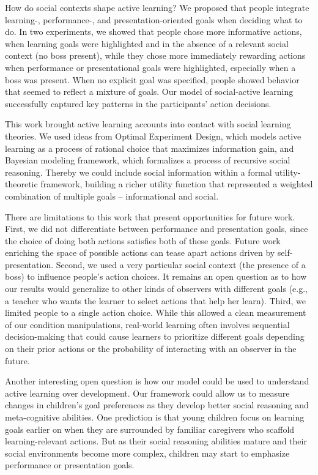 \documentclass[10pt, letterpaper]{article}
\begin{document}
How do social contexts shape active learning? We proposed that people
integrate learning-, performance-, and presentation-oriented goals when
deciding what to do. In two experiments, we showed that people chose
more informative actions, when learning goals were highlighted and in
the absence of a relevant social context (no boss present), while they
chose more immediately rewarding actions when performance or
presentational goals were highlighted, especially when a boss was
present. When no explicit goal was specified, people showed behavior
that seemed to reflect a mixture of goals. Our model of social-active
learning successfully captured key patterns in the participants' action
decisions.

This work brought active learning accounts into contact with social
learning theories. We used ideas from Optimal Experiment Design, which
models active learning as a process of rational choice that maximizes
information gain, and Bayesian modeling framework, which formalizes a
process of recursive social reasoning. Thereby we could include social
information within a formal utility-theoretic framework, building a
richer utility function that represented a weighted combination of
multiple goals -- informational and social.

There are limitations to this work that present opportunities for future
work. First, we did not differentiate between performance and
presentation goals, since the choice of doing both actions satisfies
both of these goals. Future work enriching the space of possible actions
can tease apart actions driven by self-presentation. Second, we used a
very particular social context (the presence of a boss) to influence
people's action choices. It remains an open question as to how our
results would generalize to other kinds of observers with different
goals (e.g., a teacher who wants the learner to select actions that help
her learn). Third, we limited people to a single action choice. While
this allowed a clean measurement of our condition manipulations,
real-world learning often involves sequential decision-making that could
cause learners to prioritize different goals depending on their prior
actions or the probability of interacting with an observer in the
future.

Another interesting open question is how our model could be used to
understand active learning over development. Our framework could allow
us to measure changes in children's goal preferences as they develop
better social reasoning and meta-cognitive abilities. One prediction is
that young children focus on learning goals earlier on when they are
surrounded by familiar caregivers who scaffold learning-relevant
actions. But as their social reasoning abilities mature and their social
environments become more complex, children may start to emphasize
performance or presentation goals.
\end{document}
